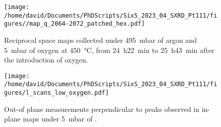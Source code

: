 
\begin{figure}[!htb]
    \centering
    \texttt{[image: /home/david/Documents/PhDScripts/SixS\_2023\_04\_SXRD\_Pt111/figures//map\_q\_2064-2072\_patched\_hex.pdf]}
    \caption{
        Reciprocal space maps collected under \qty{495}{\milli\bar} of argon and \qty{5}{\milli\bar} of oxygen at \qty{450}{\degreeCelsius}, from \qty{24}{\hour}\qty{22}{\minute} to \qty{25}{\hour}\qty{43}{\minute} after the introduction of oxygen.
    }
    \label{fig:2064QSpace}
\end{figure}

\begin{figure}[!htb]
    \centering
    \texttt{[image: /home/david/Documents/PhDScripts/SixS\_2023\_04\_SXRD\_Pt111/figures/l\_scans\_low\_oxygen.pdf]}
    \caption{
        Out-of plane measurements perpendicular to peaks observed in in-plane maps under \qty{5}{\milli\bar} of \dioxygen.
    }
    \label{fig:LScans05}
\end{figure}

